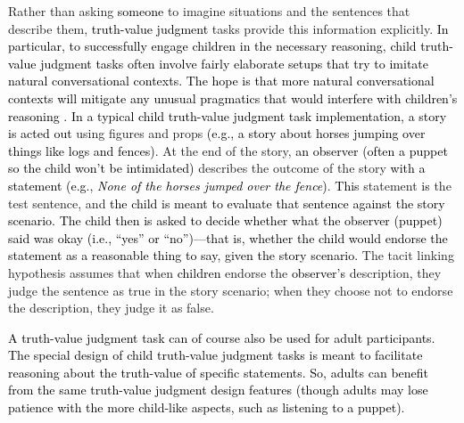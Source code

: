 \documentclass[cm]{glossa}
\newcommand{\lp}[1]{\textcolor{black}{#1}} %
\begin{document}
Rather than asking \lp{someone} to imagine situations and the sentences that describe them, 
\lp{truth-value judgment}
tasks provide this information explicitly.
\lp{In particular, to successfully engage children in the necessary reasoning, child truth-value judgment tasks often involve fairly elaborate setups that try to imitate natural conversational contexts. The hope is that more natural conversational contexts will  
mitigate any unusual pragmatics that would interfere with children's reasoning
\citep{crainmckee1985,crainthornton1998}.}
\lp{In a typical child truth-value judgment task implementation,}
\lp{a story is acted out}
using figures and props
\lp{(e.g., a story about horses jumping over things like logs and fences)}. At the end of the story, 
\lp{an observer (often a puppet so the child won't be intimidated)}
describes the outcome of the story 
\lp{with a statement}
\lp{(e.g., \textit{None of the horses jumped over the fence})}. 
\lp{This}
statement 
\lp{is}
the test sentence, and 
\lp{the child is meant to evaluate that sentence against the story scenario.}
\lp{The child then is asked to decide whether what the observer (puppet) said was okay (i.e., ``yes'' or ``no'')---that is, whether the child would endorse the statement as a reasonable thing to say, given the story scenario.}
The tacit linking hypothesis assumes that when 
\lp{children}
endorse the 
\lp{observer's}
description, they judge the sentence as true in the story scenario; 
when they choose not to endorse the description, they judge it as false.

\lp{A truth-value judgment task can of course also be used for adult participants. The special design of child truth-value judgment tasks is meant to facilitate reasoning about the truth-value of specific statements. So, adults can benefit from the same truth-value judgment design features (though adults may lose patience with the more child-like aspects, such as listening to a puppet). }
\end{document}
